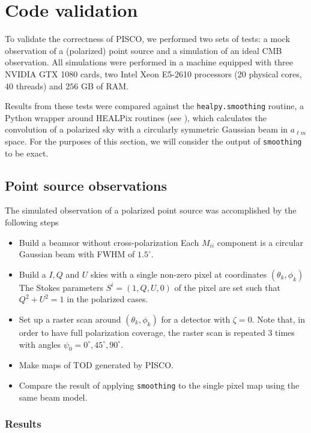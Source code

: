 \documentclass[a4paper,11pt]{article}
\begin{document}
%
\section{Code validation}
\label{sec::validation}

To validate the correctness of PISCO, we performed two sets of tests: a mock observation of a (polarized) point source and a simulation of an ideal CMB observation. All simulations were performed in a machine equipped with three NVIDIA GTX 1080 cards, two Intel Xeon E5-2610 processors (20 physical cores, 40 threads) and $256$ GB of RAM. 

Results from these tests were compared against the \texttt{healpy.smoothing} routine, a Python wrapper around HEALPix routines (see \cite{2005ApJ...622..759G}), which calculates the convolution of a polarized sky with a circularly symmetric Gaussian beam in $a_{\ell m}$ space. For the purposes of this section, we will consider the output of \texttt{smoothing} to be exact. 

\subsection{Point source observations}

The simulated observation of a polarized point source was accomplished by the following steps

\begin{itemize}
	\item Build a beamsor without cross-polarization Each $M_{ii}$ component is a circular Gaussian beam with FWHM of $1.5^\circ$.
	\item Build a $I,Q$ and $U$ skies with a single non-zero pixel at coordinates $(\theta_k,\phi_k)$ The Stokes parameters $S^{i} = (1,Q,U,0)$ of the pixel are set such that $Q^2 + U^2 = 1$ in the polarized cases.
	\item Set up a raster scan around $(\theta_k,\phi_k)$ for a detector with $\zeta=0$. Note that, in order to have full polarization coverage, the raster scan is repeated 3 times with angles $\psi_0 = 0^{\circ},45^{\circ},90^{\circ}$.
	\item Make maps of TOD generated by PISCO.
	\item Compare the result of applying \texttt{smoothing} to the single pixel map using the same beam model.
\end{itemize}

\subsubsection{Results}
\end{document}

